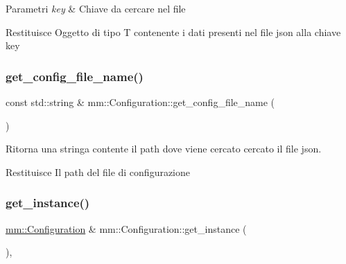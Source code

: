 \begin{DoxyParams}{Parametri}
{\em key} & Chiave da cercare nel file \\
\hline
\end{DoxyParams}
\begin{DoxyReturn}{Restituisce}
Oggetto di tipo {\ttfamily T} contenente i dati presenti nel file json alla chiave {\ttfamily key} 
\end{DoxyReturn}
\mbox{\label{classmm_1_1_configuration_a631c8525beb91fb55d72eb6b58d2d68f}} 
\subsubsection{\texorpdfstring{get\+\_\+config\+\_\+file\+\_\+name()}{get\_config\_file\_name()}}
{\footnotesize\ttfamily const std\+::string \& mm\+::\+Configuration\+::get\+\_\+config\+\_\+file\+\_\+name (\begin{DoxyParamCaption}{ }\end{DoxyParamCaption})\hspace{0.3cm}{\ttfamily [static]}}



Ritorna una stringa contente il path dove viene cercato cercato il file json. 

\begin{DoxyReturn}{Restituisce}
Il path del file di configurazione 
\end{DoxyReturn}
\mbox{\label{classmm_1_1_configuration_a5cfc5ea56062f53ef9fbd274f6dbe79e}} 
\subsubsection{\texorpdfstring{get\+\_\+instance()}{get\_instance()}}
{\footnotesize\ttfamily \hyperlink{classmm_1_1_configuration}{mm\+::\+Configuration} \& mm\+::\+Configuration\+::get\+\_\+instance (\begin{DoxyParamCaption}{ }\end{DoxyParamCaption})\hspace{0.3cm}{\ttfamily [static]}, {\ttfamily [noexcept]}}




